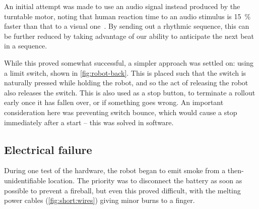 \documentclass[main.tex]{subfiles}
\begin{document}
	An initial attempt was made to use an audio signal instead produced by the turntable motor, noting that human reaction time to an audio stimulus is \SI{15}{\percent} faster than that to a visual one~\cite{reaction}.
	By sending out a rhythmic sequence, this can be further reduced by taking advantage of our ability to anticipate the next beat in a sequence.

	While this proved somewhat successful, a simpler approach was settled on: using a limit switch, shown in \cref{fig:robot-back}.
	This is placed such that the switch is naturally pressed while holding the robot, and so the act of releasing the robot also releases the switch.
	This is also used as a stop button, to terminate a rollout early once it has fallen over, or if something goes wrong\footnotemark.
	An important consideration here was preventing switch bounce, which would cause a stop immediately after a start -- this was solved in software.


\subsection{Electrical failure}
	\label{sec:electrical:failure}

	During one test of the hardware, the robot began to emit smoke from a then-unidentifiable location. The priority was to disconnect the battery as soon as possible to prevent a fireball, but even this proved difficult, with the melting power cables (\cref{fig:short:wires}) giving minor burns to a finger.
\end{document}
